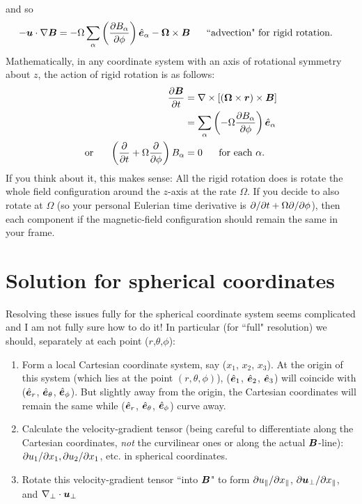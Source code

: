 \documentclass[12pt]{article}
\newcommand{\vecrot}{\bm{\Omega}}
\newcommand{\vecr}{\bm{r}}
\newcommand{\xpar}{x_\parallel}
\newcommand{\upar}{u_\parallel}
\newcommand{\uperp}{\vecu_\perp}
\begin{document}
and so
\begin{align}
	-\vecu\dotgrad\vecb &= -\Omega\sum_\alpha\left(\pderiv{B_\alpha}{\phi}\right)\e_\alpha-\vecrot\times\vecb \five \text{``advection" for rigid rotation}.
\end{align}
Mathematically, in any coordinate system with an axis of rotational symmetry about $z$, the action of rigid rotation is as follows:
\begin{align}
	\pderiv{\vecb}{t}&=\curl[(\vecrot\times\vecr)\times\vecb]\nonumber\\
	&= \sum_\alpha\left(-\Omega\pderiv{B_\alpha}{\phi}\right)\e_\alpha\nonumber\\
	\orr \left(\pderiv{}{t}+\Omega\pderiv{}{\phi}\right)B_\alpha&=0\five\text{for each $\alpha$}.
\end{align}
If you think about it, this makes sense: All the rigid rotation does is rotate the whole field configuration around the $z$-axis at the rate $\Omega$. If you decide to also rotate at $\Omega$ (so your personal Eulerian time derivative is $\partial/\partial t+\Omega\partial/\partial\phi$), then each component if the magnetic-field configuration should remain the same in your frame. 

\section{Solution for spherical coordinates}
Resolving these issues fully for the spherical coordinate system seems complicated and I am not fully sure how to do it! In particular (for ``full" resolution) we should, separately at each point ($r$,$\theta$,$\phi$):
\begin{enumerate}
	\item Form a local Cartesian coordinate system, say ($x_1$, $x_2$, $x_3$). At the origin of this system (which lies at the point $(r,\theta,\phi)$), ($\hat{\bm{e}}_1$, $\hat{\bm{e}}_2$, $\hat{\bm{e}}_3$) will coincide with ($\hat{\bm{e}}_r$, $\hat{\bm{e}}_\theta$, $\hat{\bm{e}}_\phi$). But slightly away from the origin, the Cartesian coordinates will remain the same while ($\hat{\bm{e}}_r$, $\hat{\bm{e}}_\theta$, $\hat{\bm{e}}_\phi$) curve away. 
	\item Calculate the velocity-gradient tensor (being careful to differentiate along the Cartesian coordinates, \textit{not} the curvilinear ones or along the actual $\bm{B}$-line): $\partial u_1/\partial x_1,\partial u_2/\partial x_1$, etc. in spherical coordinates.
	\item Rotate this velocity-gradient tensor ``into $\bm{B}$" to form $\pderivline{\upar}{\xpar}$, $\pderivline{\uperp}{\xpar}$, and $\nabla_\perp\cdot\uperp$
\end{enumerate}
\end{document}
